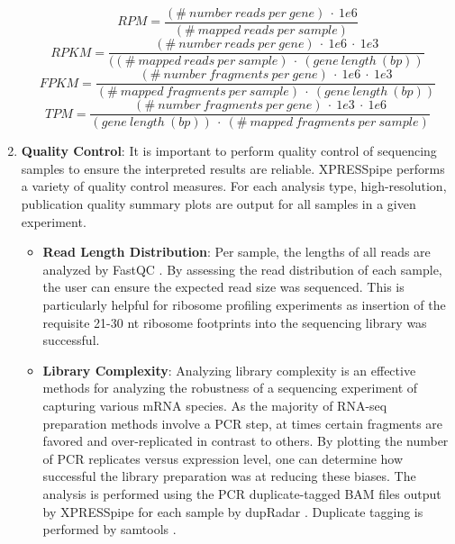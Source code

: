 \documentclass[11pt, a4paper, oneside]{article}
\begin{document}
\begin{enumerate}
  \begin{equation}
    RPM = \frac{(\#\ number\ reads\ per\ gene)\ \cdot\ 1e6}{(\#\ mapped\ reads\ per\ sample)}
  \end{equation}
  \begin{equation}
    RPKM = \frac{(\#\ number\ reads\ per\ gene)\ \cdot\ 1e6\ \cdot\ 1e3}{((\#\ mapped\ reads\ per\ sample)\ \cdot\ (gene\ length\ (bp))}
  \end{equation}
  \begin{equation}
    FPKM = \frac{(\#\ number\ fragments\ per\ gene)\ \cdot\ 1e6\ \cdot\ 1e3}{(\#\ mapped\ fragments\ per\ sample)\ \cdot\ (gene\ length\ (bp))}
  \end{equation}
  \begin{equation}
    TPM = \frac{(\#\ number\ fragments\ per\ gene)\ \cdot\ 1e3\ \cdot\ 1e6}{(gene\ length\ (bp))\ \cdot\ (\#\ mapped\ fragments\ per\ sample)}
  \end{equation}

  \item \textbf{Quality Control}:
  It is important to perform quality control of sequencing samples to ensure the interpreted results are reliable. XPRESSpipe performs a variety of quality control measures. For each analysis type, high-resolution, publication quality summary plots are output for all samples in a given experiment.

    \begin{itemize}
      \item \textbf{Read Length Distribution}: Per sample, the lengths of all reads are analyzed by FastQC \cite{fastqc}. By assessing the read distribution of each sample, the user can ensure the expected read size was sequenced. This is particularly helpful for ribosome profiling experiments as insertion of the requisite 21-30 nt ribosome footprints into the sequencing library was successful.

      \item \textbf{Library Complexity}: Analyzing library complexity is an effective methods for analyzing the robustness of a sequencing experiment of capturing various mRNA species. As the majority of RNA-seq preparation methods involve a PCR step, at times certain fragments are favored and over-replicated in contrast to others. By plotting the number of PCR replicates versus expression level, one can determine how successful the library preparation was at reducing these biases. The analysis is performed using the PCR duplicate-tagged BAM files output by XPRESSpipe for each sample by dupRadar \cite{dupradar}. Duplicate tagging is performed by samtools \cite{samtools}.


\end{itemize}
\end{enumerate}
\end{document}

